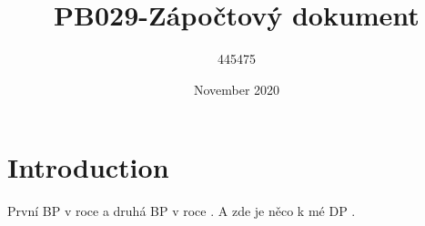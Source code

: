 \documentclass{article}
\title{PB029-Zápočtový dokument}
\author{445475 }
\date{November 2020}
\begin{document}
\maketitle

\section{Introduction}

První BP  \cite{Zouvala2018thesis} v roce \citeyear{Zouvala2018thesis} a druhá BP  \cite{Zouvala2020thesis} v roce \citeyear{Zouvala2020thesis}.
A zde je něco k mé DP \cite{li2009haad}.

\printbibliography[title = {Seznam bibliografických citací}] 
\end{document}

